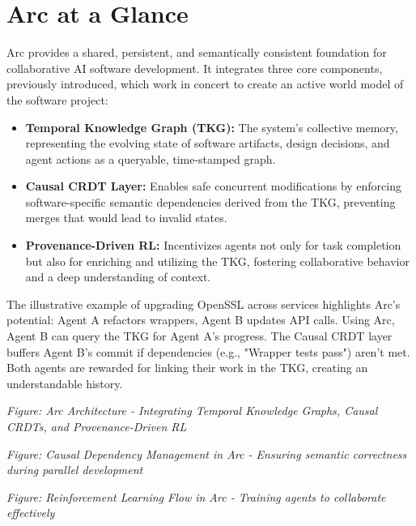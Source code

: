 \documentclass{article}
\begin{document}
\section{Arc at a Glance}
Arc provides a shared, persistent, and semantically consistent foundation for collaborative AI software development. It integrates three core components, previously introduced, which work in concert to create an active world model of the software project:
\begin{itemize}
    \item \textbf{Temporal Knowledge Graph (TKG):} The system's collective memory, representing the evolving state of software artifacts, design decisions, and agent actions as a queryable, time-stamped graph.
    \item \textbf{Causal CRDT Layer:} Enables safe concurrent modifications by enforcing software-specific semantic dependencies derived from the TKG, preventing merges that would lead to invalid states.
    \item \textbf{Provenance-Driven RL:} Incentivizes agents not only for task completion but also for enriching and utilizing the TKG, fostering collaborative behavior and a deep understanding of context.
\end{itemize}
The illustrative example of upgrading OpenSSL across services highlights Arc's potential: Agent A refactors wrappers, Agent B updates API calls. Using Arc, Agent B can query the TKG for Agent A's progress. The Causal CRDT layer buffers Agent B's commit if dependencies (e.g., "Wrapper tests pass") aren't met. Both agents are rewarded for linking their work in the TKG, creating an understandable history.


\begin{center}
\textit{Figure: Arc Architecture - Integrating Temporal Knowledge Graphs, Causal CRDTs, and Provenance-Driven RL}
\end{center}


\begin{center}
\textit{Figure: Causal Dependency Management in Arc - Ensuring semantic correctness during parallel development}
\end{center}


\begin{center}
\textit{Figure: Reinforcement Learning Flow in Arc - Training agents to collaborate effectively}
\end{center}
\end{document}
